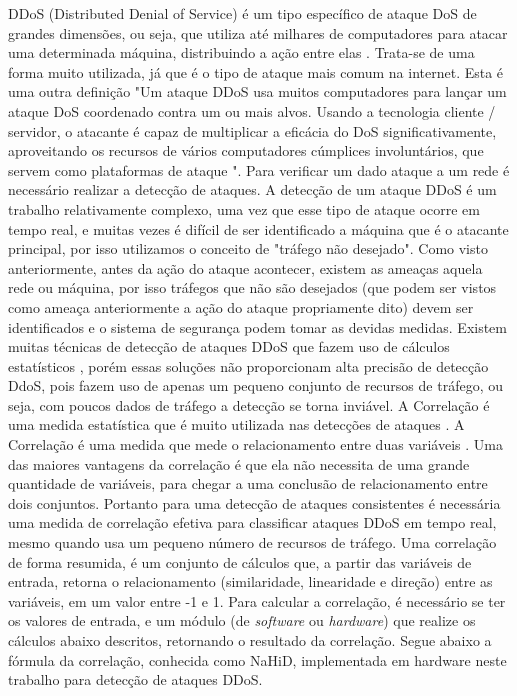 DDoS (Distributed Denial of Service) é um tipo específico de ataque DoS de grandes dimensões, ou seja, que utiliza até milhares de computadores para atacar uma determinada máquina, distribuindo a ação entre elas \cite{alecrim2008ataques}. Trata-se de uma forma muito utilizada, já que é o tipo de ataque mais comum na internet. Esta é uma outra definição\: "Um ataque DDoS usa muitos computadores para lançar um ataque DoS coordenado contra um ou mais alvos. Usando a tecnologia cliente / servidor, o atacante é capaz de multiplicar a eficácia do DoS significativamente, aproveitando os recursos de vários computadores cúmplices involuntários, que servem como plataformas de ataque "\cite{stein2002world}. Para verificar um dado ataque a um rede é necessário realizar a detecção de ataques. A detecção de um ataque DDoS é um trabalho relativamente complexo, uma vez que esse tipo de ataque ocorre em tempo real, e muitas vezes é difícil de ser identificado a máquina que é o atacante principal, por isso utilizamos o conceito de "tráfego não desejado". Como visto anteriormente, antes da ação do ataque acontecer, existem as ameaças aquela rede ou máquina, por isso tráfegos que não são desejados (que podem ser vistos como ameaça anteriormente a ação do ataque propriamente dito) devem ser identificados e o sistema de segurança podem tomar as devidas medidas. Existem muitas técnicas de detecção de ataques DDoS que fazem uso de cálculos estatísticos \cite{6814272}, porém essas soluções não proporcionam alta precisão de detecção DdoS, pois fazem uso de apenas um pequeno conjunto de recursos de tráfego, ou seja, com poucos dados de tráfego a detecção se torna inviável. A Correlação é uma medida estatística que é muito utilizada nas detecções de ataques \cite{yu2012discriminating}. A Correlação é uma medida que mede o relacionamento entre duas variáveis .  Uma das maiores vantagens da correlação é que ela não necessita de uma grande quantidade de variáveis, para chegar a uma conclusão de relacionamento entre dois conjuntos. Portanto para uma detecção de ataques consistentes é necessária uma medida de correlação efetiva para classificar ataques DDoS  em tempo real, mesmo quando usa um pequeno número de recursos de tráfego. Uma correlação de forma resumida, é um conjunto de cálculos que, a partir das variáveis de entrada, retorna o relacionamento (similaridade, linearidade e direção) entre as variáveis, em um valor entre -1 e 1. Para calcular a correlação, é necessário se ter os valores de entrada, e um módulo (de \textit{software} ou \textit{hardware}) que realize os  cálculos abaixo descritos, retornando o resultado da correlação. Segue abaixo a fórmula da correlação, conhecida como NaHiD, implementada em hardware neste trabalho para detecção de ataques DDoS.


